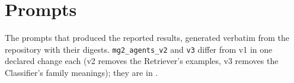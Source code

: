 \chapter{Prompts}
\label{app:prompts}
The prompts that produced the reported results, generated verbatim from the repository with their
digests. \texttt{mg2\_agents\_v2} and \texttt{v3} differ from v1 in one declared change each (v2
removes the Retriever's examples, v3 removes the Classifier's family meanings); they are in
.


